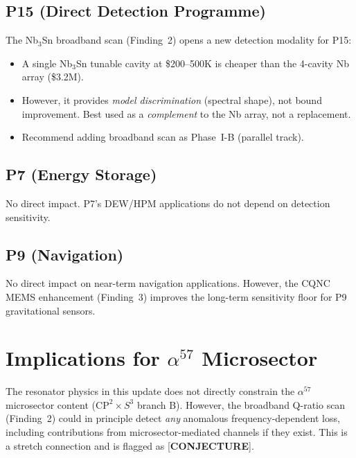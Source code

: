 \documentclass[11pt]{article}
\theoremstyle{definition}
\theoremstyle{remark}
\begin{document}
\subsection{P15 (Direct Detection Programme)}

The Nb$_3$Sn broadband scan (Finding~2) opens a new detection modality
for P15:
\begin{itemize}[nosep]
\item A single Nb$_3$Sn tunable cavity at \$200--500K is cheaper than
  the 4-cavity Nb array (\$3.2M).
\item However, it provides \emph{model discrimination} (spectral shape),
  not bound improvement. Best used as a \emph{complement} to the
  Nb array, not a replacement.
\item Recommend adding broadband scan as Phase~I-B (parallel track).
\end{itemize}

\subsection{P7 (Energy Storage)}

No direct impact. P7's DEW/HPM applications do not depend on detection
sensitivity.

\subsection{P9 (Navigation)}

No direct impact on near-term navigation applications. However, the
CQNC MEMS enhancement (Finding~3) improves the long-term sensitivity
floor for P9 gravitational sensors.


\section{Implications for $\alpha^{57}$ Microsector}

The resonator physics in this update does not directly constrain the
$\alpha^{57}$ microsector content ($\text{CP}^2\times S^3$ branch B).
However, the broadband Q-ratio scan (Finding~2) could in principle
detect \emph{any} anomalous frequency-dependent loss, including
contributions from microsector-mediated channels if they exist. This
is a stretch connection and is flagged as [\textbf{CONJECTURE}].


\end{document}
